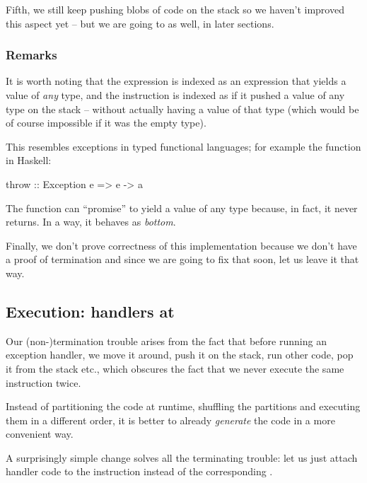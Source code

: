 
Fifth, we still keep pushing blobs of code on the stack so we haven't improved
this aspect yet -- but we are going to as well, in later sections.


\subsubsection{Remarks}

It is worth noting that the expression  is indexed as an expression
that yields a value of \emph{any} type, and the instruction  is indexed
as if it pushed a value of any type on the stack -- without actually having a value
of that type (which would be of course impossible if it was the empty type).

This resembles exceptions in typed functional languages; for example the function
 in Haskell:
\begin{code}
  throw :: Exception e => e -> a
\end{code}
The function  can ``promise'' to yield a value of any type because,
in fact, it never returns. In a way, it behaves as \emph{bottom}.

Finally, we don't prove correctness of this implementation because we don't
have a proof of termination and since we are going to fix that soon, let us
leave it that way.

\subsection{Execution: handlers at }
\label{sec:handlers-at-unmark}

Our (non-)termination trouble arises from the fact that before running an
exception handler, we move it around, push it on the stack, run other code, pop
it from the stack etc., which obscures the fact that we never execute the same
instruction twice.

Instead of partitioning the code at runtime, shuffling the partitions and
executing them in a different order, it is better to already \emph{generate}
the code in a more convenient way.

A surprisingly simple change solves all the terminating trouble: let us just
attach handler code to the instruction  instead of the
corresponding .

